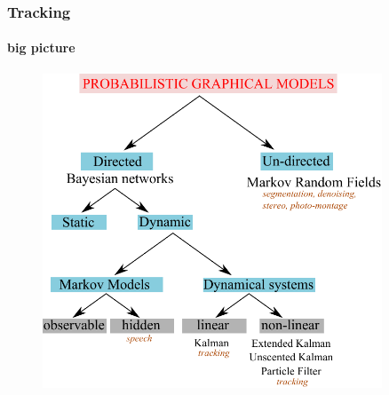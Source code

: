 \begin{frame}
\frametitle{Tracking}
\framesubtitle{big picture}
\logoCSIPCPL\mypagenum
	\begin{figure}
		\includegraphics[width=0.9\textwidth]{thesis/PRML_PGM_overview.pdf}
	\end{figure}
\end{frame}






